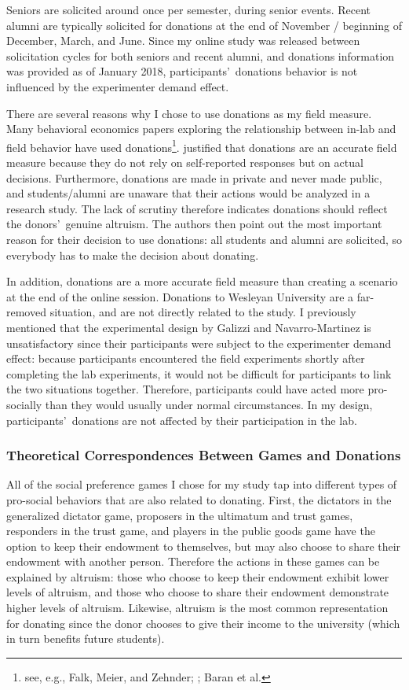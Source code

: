 \documentclass[12pt]{article}
\begin{document}
Seniors are solicited around once per semester, during senior events. Recent alumni are typically solicited for donations at the end of November / beginning of December, March, and June. Since my online study was released between solicitation cycles for both seniors and recent alumni, and donations information was provided as of January 2018, participants\rq \ donations behavior is not influenced by the experimenter demand effect. 

There are several reasons why I chose to use donations as my field measure. Many behavioral economics papers exploring the relationship between in-lab and field behavior have used donations\footnote{see, e.g., Falk, Meier, and Zehnder; \cite{benz_meier_2006}; Baran et al.}. \cite{falk_2013} justified that donations are an accurate field measure because they do not rely on self-reported responses but on actual decisions. Furthermore, donations are made in private and never made public, and students/alumni are unaware that their actions would be analyzed in a research study. The lack of scrutiny therefore indicates donations should reflect the donors\rq \ genuine altruism. The authors then point out the most important reason for their decision to use donations: all students and alumni are solicited, so everybody has to make the decision about donating.

In addition, donations are a more accurate field measure than creating a scenario at the end of the online session. Donations to Wesleyan University are a far-removed situation, and are not directly related to the study. I previously mentioned that the experimental design by Galizzi and Navarro-Martinez is unsatisfactory since their participants were subject to the experimenter demand effect: because participants encountered the field experiments shortly after completing the lab experiments, it would not be difficult for participants to link the two situations together. Therefore, participants could have acted more pro-socially than they would usually under normal circumstances. In my design, participants\rq \ donations are not affected by their participation in the lab.

\subsubsection{Theoretical Correspondences Between Games and Donations}

All of the social preference games I chose for my study tap into different types of pro-social behaviors that are also related to donating. First, the dictators in the generalized dictator game, proposers in the ultimatum and trust games, responders in the trust game, and players in the public goods game have the option to keep their endowment to themselves, but may also choose to share their endowment with another person. Therefore the actions in these games can be explained by altruism: those who choose to keep their endowment exhibit lower levels of altruism, and those who choose to share their endowment demonstrate higher levels of altruism. Likewise, altruism is the most common representation for donating since the donor chooses to give their income to the university (which in turn benefits future students). 
\end{document}
